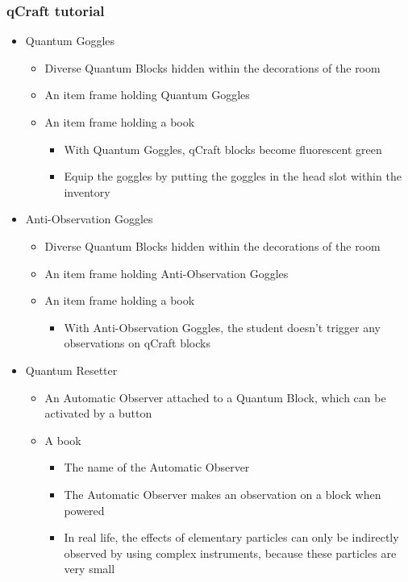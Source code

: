 \documentclass[11pt,twoside]{report} %
\begin{document}
\subsubsection{qCraft tutorial}
\begin{itemize}
	\item Quantum Goggles
	\begin{itemize}
		\item Diverse Quantum Blocks hidden within the decorations of the room
		\item An item frame holding Quantum Goggles
		\item An item frame holding a book
		\begin{itemize}
			\item With Quantum Goggles, qCraft blocks become fluorescent green
			\item Equip the goggles by putting the goggles in the head slot within the inventory
		\end{itemize}
	\end{itemize}
	\item Anti-Observation Goggles
	\begin{itemize}
		\item Diverse Quantum Blocks hidden within the decorations of the room
		\item An item frame holding Anti-Observation Goggles
		\item An item frame holding a book
		\begin{itemize}
			\item With Anti-Observation Goggles, the student doesn't trigger any observations on qCraft blocks
		\end{itemize}
	\end{itemize}
	\item Quantum Resetter
	\begin{itemize}
		\item An Automatic Observer attached to a Quantum Block, which can be activated by a button
		\item A book
		\begin{itemize}
			\item The name of the Automatic Observer
			\item The Automatic Observer makes an observation on a block when powered
			\item In real life, the effects of elementary particles can only be indirectly observed by using complex instruments, because these particles are very small
		\end{itemize}
	\end{itemize}
\end{itemize}
\end{document}
